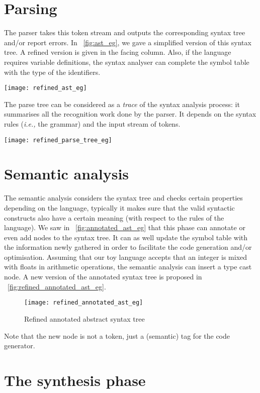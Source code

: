 \section*{Parsing}

The parser takes this token stream and outputs the corresponding
syntax tree and/or report errors. In \fig~\vref{fig:ast_eg}, we gave a
simplified version of this syntax tree. A refined version is given in
the facing column. Also, if the language requires variable
definitions, the syntax analyser can complete the symbol table with
the type of the identifiers.
\begin{center}
  \texttt{[image: refined\_ast\_eg]}
\end{center}
The parse tree can be considered as a \emph{trace} of the syntax
analysis process: it summarises all the recognition work done by the
parser. It depends on the syntax rules (\emph{i.e.,} the grammar) and
the input stream of tokens.
\begin{center}
\texttt{[image: refined\_parse\_tree\_eg]}
\end{center}

\section*{Semantic analysis}

The semantic analysis considers the syntax tree and checks certain
properties depending on the language, typically it makes sure that the
valid syntactic constructs also have a certain meaning (with respect
to the rules of the language). We saw in \fig~\vref{fig:annotated_ast_eg} that
this phase can annotate or even add nodes to the syntax tree. It can
as well update the symbol table with the information newly gathered in
order to facilitate the code generation and/or optimisation. Assuming
that our toy language accepts that an integer is mixed with floats in
arithmetic operations, the semantic analysis can insert a type cast
node. A new version of the annotated syntax tree is proposed in \fig~\vref{fig:refined_annotated_ast_eg}.
\begin{figure}[b]
\centering
\texttt{[image: refined\_annotated\_ast\_eg]}
\caption{Refined annotated abstract syntax tree}
\label{fig:refined_annotated_ast_eg}
\end{figure}
Note that the new node is not a token, just a (semantic) tag for the
code generator.

\section*{The synthesis phase}

